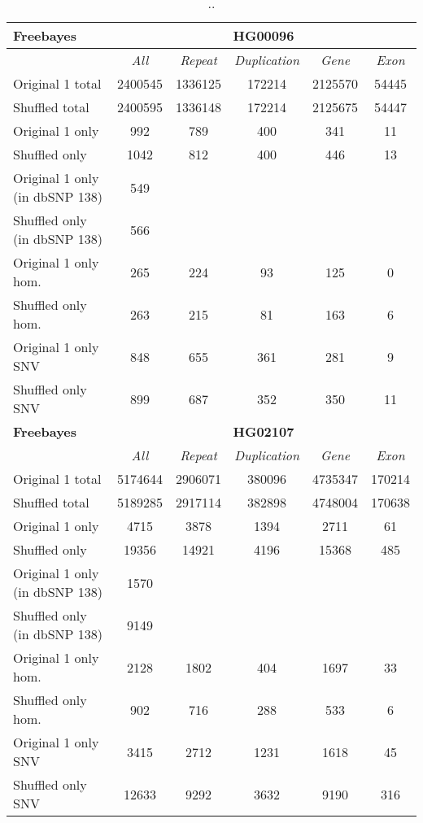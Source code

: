\begin{table}[htb]
\caption{ .. }
\begin{center}
\begin{tabular}{|l|c||c|c|c|c|}
\hline
{\bf Freebayes} & \multicolumn{5}{|c|}{\bf HG00096} \\
\hline
\cline{2-6}
{\bf} & {\it All} & {\it Repeat} & {\it Duplication} & {\it Gene} & {\it Exon} \\
\hline
Original 1 total & 2400545 & 1336125 & 172214 & 2125570 & 54445\\ 
\hline
Shuffled total & 2400595 & 1336148 & 172214 & 2125675 & 54447\\ 
\hline
Original 1 only & 992 & 789 & 400 & 341 & 11\\ 
\hline
Shuffled only & 1042 & 812 & 400 & 446 & 13\\ 
\hline
Original 1 only (in dbSNP 138) & 549 &  &  &  & \\ 
\hline
Shuffled only (in dbSNP 138) & 566 &  &  &  & \\ 
\hline
Original 1 only hom. & 265 & 224 & 93 & 125 & 0\\ 
\hline
Shuffled only hom. & 263 & 215 & 81 & 163 & 6\\ 
\hline
Original 1 only SNV & 848 & 655 & 361 & 281 & 9\\ 
\hline
Shuffled only SNV & 899 & 687 & 352 & 350 & 11\\ 
\hline
\hline
{\bf Freebayes} & \multicolumn{5}{|c|}{\bf HG02107} \\
\hline
\cline{2-6}
{\bf} & {\it All} & {\it Repeat} & {\it Duplication} & {\it Gene} & {\it Exon} \\
\hline
Original 1 total & 5174644 & 2906071 & 380096 & 4735347 & 170214\\ 
\hline
Shuffled total & 5189285 & 2917114 & 382898 & 4748004 & 170638\\ 
\hline
Original 1 only & 4715 & 3878 & 1394 & 2711 & 61\\ 
\hline
Shuffled only & 19356 & 14921 & 4196 & 15368 & 485\\ 
\hline
Original 1 only (in dbSNP 138) & 1570 &  &  &  & \\ 
\hline
Shuffled only (in dbSNP 138) & 9149 &  &  &  & \\ 
\hline
Original 1 only hom. & 2128 & 1802 & 404 & 1697 & 33\\ 
\hline
Shuffled only hom. & 902 & 716 & 288 & 533 & 6\\ 
\hline
Original 1 only SNV & 3415 & 2712 & 1231 & 1618 & 45\\ 
\hline
Shuffled only SNV & 12633 & 9292 & 3632 & 9190 & 316\\  
\hline
\end{tabular}
\end{center}
\label{tab:orig-vs-shuf-freebayes}
\end{table}

